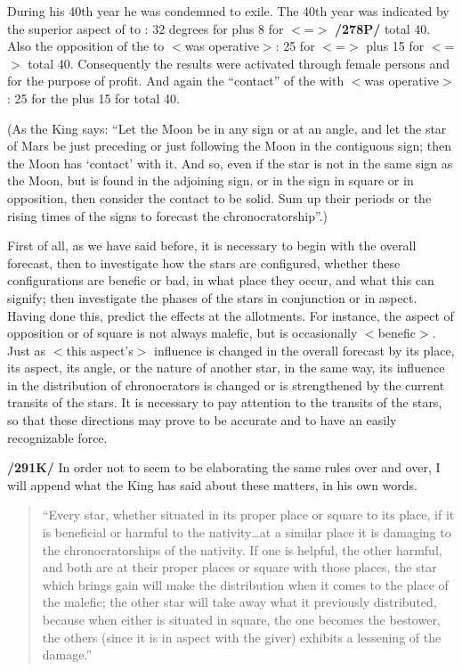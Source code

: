 During his 40th year he was condemned to exile. The 40th year
was indicated by the superior aspect of \Saturn\xspace to \Libra: 32 degrees for \Cancer\xspace plus 8 for \Libra\xspace $<$=\Venus$>$
\textbf{/278P/} total 40. Also the opposition of the \Moon\xspace to \Venus\xspace $<$was operative$>$: 25 for \Taurus\xspace $<$=\Moon$>$ plus 15 for \Scorpio\xspace $<$=\Mars$>$ total 40. Consequently the results were activated through female persons and
for the purpose of profit. And again the “contact” of the \Moon\xspace with \Mars\xspace $<$was operative$>$: 25 for the \Moon\xspace plus 15 for \Mars\xspace total 40.

(As the King says: “Let the Moon be in any sign or at an angle, and let the star of Mars be just preceding or just following the Moon in the contiguous sign; then the Moon has ‘contact’ with it. And so, even if the star is not in the same sign as the Moon, but is found in the adjoining sign, or in the sign in square or in opposition, then consider the contact to be solid. Sum up their periods or the rising times of
the signs to forecast the chronocratorship”.)

First of all, as we have said before, it is necessary to begin with the overall forecast, then to investigate how the stars are configured, whether these configurations are benefic or bad, in what place they occur, and what this can signify; then investigate the phases of the stars in conjunction or in aspect. Having done this, predict the effects at the allotments. For \mndl instance, the aspect of opposition or of square is not always malefic, but is occasionally $<$benefic$>$. Just as $<$this aspect’s$>$ influence is changed in the overall forecast by its place, its aspect, its angle, or the nature of another star, in the same way, its influence in the distribution of chronocrators is changed or is strengthened by the current transits of the stars. It is necessary to pay attention to the transits of the stars, so that these directions may prove to be accurate and to have an easily recognizable force.

\textbf{/291K/} In order not to seem to be elaborating the same rules over and over, I will append what the King has said about these matters, in his own words.
\begin{quote}
“Every star, whether situated in its proper place or square to its place, if it is beneficial or harmful to the nativity…at a similar place it is damaging to the chronocratorships of the nativity. If one is helpful, the other harmful, and both are at their proper places or square with those places, the star which brings gain will make the distribution when it comes to the place of the malefic; the other star will take away what it previously distributed, because when either is situated in square, the one becomes the bestower, the others (since it is in aspect with the giver) exhibits a lessening of the damage.”
\end{quote}

